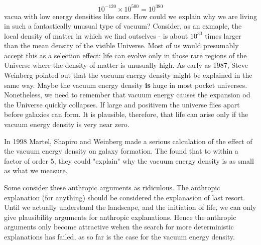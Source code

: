 \begin{equation*}
    10^{-120} \times 10^{500} = 10^{380}
\end{equation*}
vacua with low energy densities like ours. How could we explain why we are living in such a fantastically unusual type of vacuum? Consider, as an exmaple, the local density of matter in which we find outselves - is about $10^{30}$ times larger than the mean density of the visible Universe. Most of us would presumably accept this as a selection effect: life can evolve only in those rare regions of the Universe where the density of matter is unusually high. As early as 1987, Steve Weinberg pointed out that the vacuum energy density might be explained in the same way. Maybe the vacuum energy density \textbf{is} huge in most pocket universes. Nonetheless, we need to remember that vacuum energy causes the expansion od the Universe quickly collapses. If large and positivem the universe flies apart before galaxies can form. It is plausible, therefore, that life can arise only if the vacuum energy density is very near zero.

In 1998 Martel, Shapiro and Weinberg made a serious calculation of the effect of the vacuum energy density on galaxy formation. The found that to within a factor of order 5, they could "explain" why the vacuum energy density is as small as what we measure.

Some consider these anthropic arguments as ridiculous. The anthropic explanation (for anything) should be considered the explanasion of last resort. Until we actually understand the landscape, and the initiation of life, we can only give plausibility arguments for anthropic explanations. Hence the anthropic arguments only become attractive wehen the search for more deterministic explanations has failed, as so far is the case for the vacuum energy density.